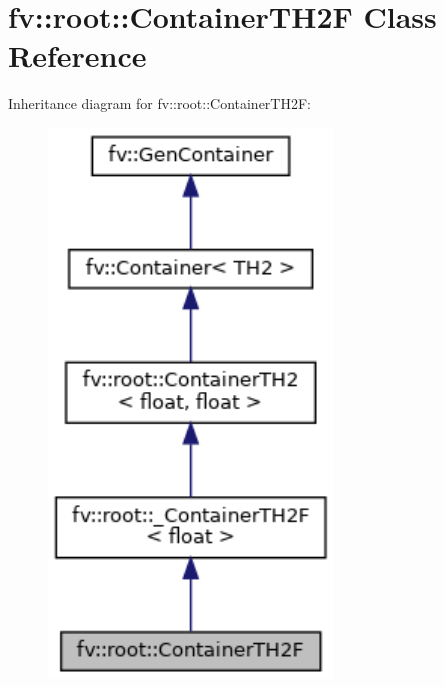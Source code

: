 \hypertarget{classfv_1_1root_1_1ContainerTH2F}{}\section{fv\+:\+:root\+:\+:Container\+T\+H2F Class Reference}
\label{classfv_1_1root_1_1ContainerTH2F}


Inheritance diagram for fv\+:\+:root\+:\+:Container\+T\+H2F\+:
\nopagebreak
\begin{figure}[H]
\begin{center}
\leavevmode
\includegraphics[width=214pt]{classfv_1_1root_1_1ContainerTH2F__inherit__graph}
\end{center}
\end{figure}


